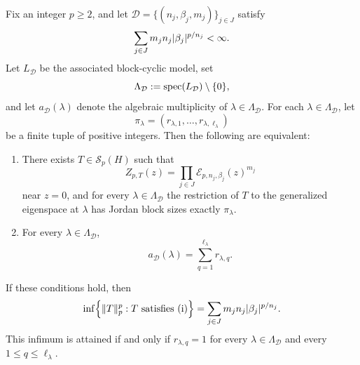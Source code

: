 \begin{theorem}
  \label{thm:schatten-jordan}
  Fix an integer \(p\ge 2\), and let
  \(
    \mathcal D=\{(n_j,\beta_j,m_j)\}_{j\in J}
  \)
  satisfy
  \[
    \sum_{j\in J}m_jn_j\lvert \beta_j \rvert^{p/n_j}<\infty.
  \]
  Let \(L_{\mathcal D}\) be the associated block-cyclic model, set
  \[
    \Lambda_{\mathcal D}:=\operatorname{spec}(L_{\mathcal D})\setminus\{0\},
  \]
  and let \(a_{\mathcal D}(\lambda)\) denote the algebraic multiplicity
  of \(\lambda\in\Lambda_{\mathcal D}\). For each
  \(\lambda\in\Lambda_{\mathcal D}\), let
  \[
    \pi_\lambda=(r_{\lambda,1},\dots,r_{\lambda,\ell_\lambda})
  \]
  be a finite tuple of positive integers. Then the following are
  equivalent:
  \begin{enumerate}[label=\textup{(\roman*)}]
    \item There exists \(T\in \mathcal S_p(H)\) such that
      \[
        Z_{p,T}(z)
        =\prod_{j\in J}\mathcal E_{p,n_j,\beta_j}(z)^{m_j}
      \]
      near \(z=0\), and for every \(\lambda\in\Lambda_{\mathcal D}\)
      the restriction of \(T\) to the generalized eigenspace at
      \(\lambda\) has Jordan block sizes exactly \(\pi_\lambda\).
    \item For every \(\lambda\in\Lambda_{\mathcal D}\),
      \[
        a_{\mathcal D}(\lambda)
        =\sum_{q=1}^{\ell_\lambda}r_{\lambda,q}.
      \]
  \end{enumerate}
  If these conditions hold, then
  \[
    \inf\Bigl\{\|T\|_p^p:T\text{ satisfies \textup{(i)}}\Bigr\}
    =\sum_{j\in J}m_jn_j\lvert \beta_j \rvert^{p/n_j}.
  \]
  This infimum is attained if and only if
  \(r_{\lambda,q}=1\) for every \(\lambda\in\Lambda_{\mathcal D}\) and
  every \(1\le q\le \ell_\lambda\).
\end{theorem}

